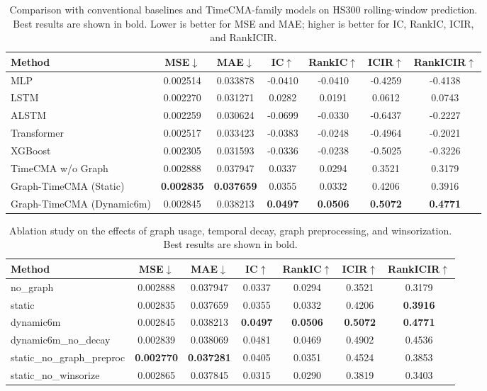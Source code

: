 \begin{table}[t]
\centering
\small
\setlength{\tabcolsep}{8pt}
\caption{Comparison with conventional baselines and TimeCMA-family models on HS300 rolling-window prediction. Best results are shown in bold. Lower is better for MSE and MAE; higher is better for IC, RankIC, ICIR, and RankICIR.}
\label{tab:main_results}
\begin{tabular}{lcccccc}
\toprule
Method & MSE$\downarrow$ & MAE$\downarrow$ & IC$\uparrow$ & RankIC$\uparrow$ & ICIR$\uparrow$ & RankICIR$\uparrow$ \\
\midrule
MLP & 0.002514 & 0.033878 & -0.0410 & -0.0410 & -0.4259 & -0.4138 \\
LSTM & 0.002270 & 0.031271 & 0.0282 & 0.0191 & 0.0612 & 0.0743 \\
ALSTM & 0.002259 & 0.030624 & -0.0699 & -0.0330 & -0.6437 & -0.2227 \\
Transformer & 0.002517 & 0.033423 & -0.0383 & -0.0248 & -0.4964 & -0.2021 \\
XGBoost & 0.002305 & 0.031593 & -0.0336 & -0.0238 & -0.5025 & -0.3226 \\
\midrule
TimeCMA w/o Graph & 0.002888 & 0.037947 & 0.0337 & 0.0294 & 0.3521 & 0.3179 \\
Graph-TimeCMA (Static) & \textbf{0.002835} & \textbf{0.037659} & 0.0355 & 0.0332 & 0.4206 & 0.3916 \\
Graph-TimeCMA (Dynamic6m) & 0.002845 & 0.038213 & \textbf{0.0497} & \textbf{0.0506} & \textbf{0.5072} & \textbf{0.4771} \\
\bottomrule
\end{tabular}
\end{table}

\begin{table}[t]
\centering
\small
\setlength{\tabcolsep}{8pt}
\caption{Ablation study on the effects of graph usage, temporal decay, graph preprocessing, and winsorization. Best results are shown in bold.}
\label{tab:ablation_results}
\begin{tabular}{lcccccc}
\toprule
Method & MSE$\downarrow$ & MAE$\downarrow$ & IC$\uparrow$ & RankIC$\uparrow$ & ICIR$\uparrow$ & RankICIR$\uparrow$ \\
\midrule
no\_graph & 0.002888 & 0.037947 & 0.0337 & 0.0294 & 0.3521 & 0.3179 \\
static & 0.002835 & 0.037659 & 0.0355 & 0.0332 & 0.4206 & \textbf{0.3916} \\
dynamic6m & 0.002845 & 0.038213 & \textbf{0.0497} & \textbf{0.0506} & \textbf{0.5072} & \textbf{0.4771} \\
dynamic6m\_no\_decay & 0.002839 & 0.038069 & 0.0481 & 0.0469 & 0.4902 & 0.4536 \\
static\_no\_graph\_preproc & \textbf{0.002770} & \textbf{0.037281} & 0.0405 & 0.0351 & 0.4524 & 0.3853 \\
static\_no\_winsorize & 0.002865 & 0.037845 & 0.0315 & 0.0290 & 0.3819 & 0.3403 \\
\bottomrule
\end{tabular}
\end{table}

